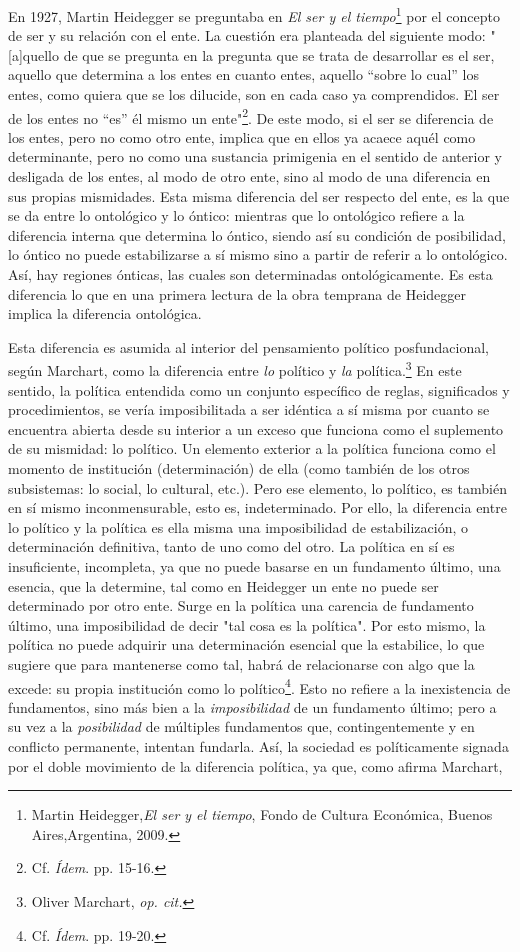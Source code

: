 \documentclass{book}
\begin{document}
En 1927, Martin Heidegger se preguntaba en \emph{El ser y el
tiempo}\footnote{Martin Heidegger,\emph{El ser y el tiempo}, Fondo de
  Cultura Económica, Buenos Aires,Argentina, 2009.} por el concepto de
ser y su relación con el ente. La cuestión era planteada del siguiente
modo: "{[}a{]}quello de que se pregunta en la pregunta que se trata de
desarrollar es el ser, aquello que determina a los entes en cuanto
entes, aquello ``sobre lo cual'' los entes, como quiera que se los
dilucide, son en cada caso ya comprendidos. El ser de los entes no
``es'' él mismo un ente"\footnote{Cf. \emph{Ídem}. pp. 15-16.}. De este
modo, si el ser se diferencia de los entes, pero no como otro ente,
implica que en ellos ya acaece aquél como determinante, pero no como una
sustancia primigenia en el sentido de anterior y desligada de los entes,
al modo de otro ente, sino al modo de una diferencia en sus propias
mismidades. Esta misma diferencia del ser respecto del ente, es la que
se da entre lo ontológico y lo óntico: mientras que lo ontológico
refiere a la diferencia interna que determina lo óntico, siendo así su
condición de posibilidad, lo óntico no puede estabilizarse a sí mismo
sino a partir de referir a lo ontológico. Así, hay regiones ónticas, las
cuales son determinadas ontológicamente. Es esta diferencia lo que en
una primera lectura de la obra temprana de Heidegger implica la
diferencia ontológica.

Esta diferencia es asumida al interior del pensamiento político
posfundacional, según Marchart, como la diferencia entre \emph{lo}
político y \emph{la} política.\footnote{Oliver Marchart, \emph{op. cit.}}
En este sentido, la política entendida como un conjunto específico de
reglas, significados y procedimientos, se vería imposibilitada a ser
idéntica a sí misma por cuanto se encuentra abierta desde su interior a
un exceso que funciona como el suplemento de su mismidad: lo político.
Un elemento exterior a la política funciona como el momento de
institución (determinación) de ella (como también de los otros
subsistemas: lo social, lo cultural, etc.). Pero ese elemento, lo
político, es también en sí mismo inconmensurable, esto es,
indeterminado. Por ello, la diferencia entre lo político y la política
es ella misma una imposibilidad de estabilización, o determinación
definitiva, tanto de uno como del otro. La política en sí es
insuficiente, incompleta, ya que no puede basarse en un fundamento
último, una esencia, que la determine, tal como en Heidegger un ente no
puede ser determinado por otro ente. Surge en la política una carencia
de fundamento último, una imposibilidad de decir "tal cosa es la
política". Por esto mismo, la política no puede adquirir una
determinación esencial que la estabilice, lo que sugiere que para
mantenerse como tal, habrá de relacionarse con algo que la excede: su
propia institución como lo político\footnote{Cf. \emph{Ídem}. pp. 19-20.}.
Esto no refiere a la inexistencia de fundamentos, sino más bien a la
\emph{imposibilidad} de un fundamento último; pero a su vez a la
\emph{posibilidad} de múltiples fundamentos que, contingentemente y en
conflicto permanente, intentan fundarla. Así, la sociedad es
políticamente signada por el doble movimiento de la diferencia política,
ya que, como afirma Marchart,
\end{document}
